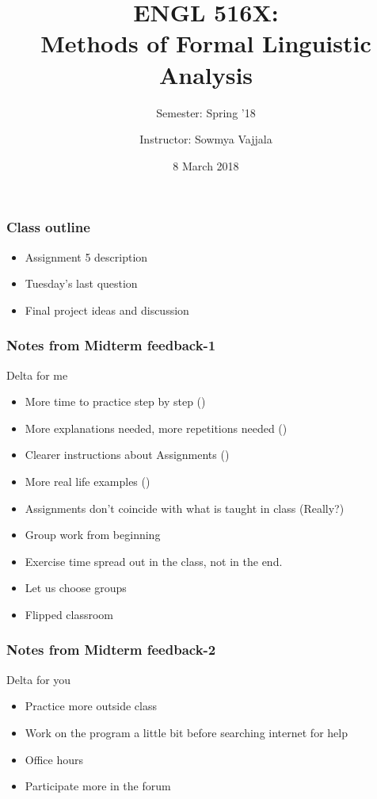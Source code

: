 \documentclass{beamer}
\author[Sowmya Vajjala]{Instructor: Sowmya Vajjala}
\title[ENGL 516X]{ENGL 516X: \\ Methods of Formal Linguistic Analysis}
\subtitle{Semester: Spring '18}
\date{8 March 2018}
\institute{Iowa State University, USA}
\begin{document}
\begin{frame}\titlepage
\end{frame}

\begin{frame}%
\frametitle{Class outline}
\begin{itemize}
\item Assignment 5 description
\item Tuesday's last question
\item Final project ideas and discussion
\end{itemize}
\end{frame}

\begin{frame}
\frametitle{Notes from Midterm feedback-1}
Delta for me
\begin{itemize}
\item More time to practice step by step (\leftthumbsup)
\item More explanations needed, more repetitions needed (\leftthumbsup)
\item Clearer instructions about Assignments (\leftthumbsup)
\item More real life examples (\leftthumbsup)
\item Assignments don't coincide with what is taught in class (Really?)
\item Group work from beginning
\item Exercise time spread out in the class, not in the end.
\item Let us choose groups 
\item Flipped classroom
\end{itemize}
\end{frame}

\begin{frame}
\frametitle{Notes from Midterm feedback-2}
Delta for you
\begin{itemize}
\item Practice more outside class
\item Work on the program a little bit before searching internet for help
\item Office hours
\item Participate more in the forum
\end{itemize}
\end{frame}
\end{document}
